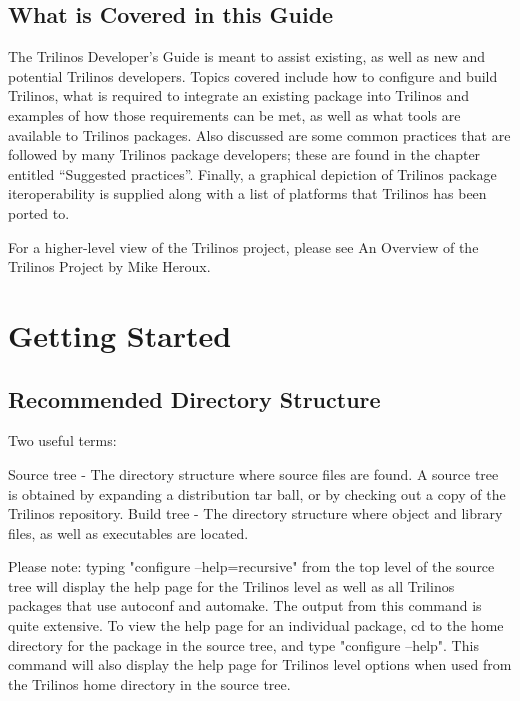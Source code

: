 \documentclass[12pt,relax]{SANDreport}
\begin{document}
	\subsection{What is Covered in this Guide}

The Trilinos Developer's Guide is meant to assist existing, as well as new and
potential Trilinos developers.  Topics covered include how to configure and 
build Trilinos, what is required to integrate an existing package into Trilinos
and examples of how those requirements can be met, as well as what tools are 
available to Trilinos packages.  Also discussed are some common practices that 
are followed by many Trilinos package developers; these are found in the 
chapter entitled ``Suggested practices''.  Finally, a graphical depiction of 
Trilinos package iteroperability is supplied along with a list of platforms 
that Trilinos has been ported to.

For a higher-level view of the Trilinos project, please see An Overview
of the Trilinos Project by Mike Heroux. 

	\section{Getting Started}

\subsection{Recommended Directory Structure}

Two useful terms:

Source tree - The directory structure where source files are found.  A source 
	tree is obtained by expanding a distribution tar ball, or by checking 
	out a copy of the Trilinos repository.  
Build tree - The directory structure where object and library files, as well 
	as executables are located.  

Please note: typing "configure --help=recursive" from the top level of the 
source tree will display the help page for the Trilinos level as well as all 
Trilinos packages that use autoconf and automake.  The output from this command
is quite extensive.  To view the help page for an individual package, cd to 
the home directory for the package in the source tree, and type "configure 
--help".  This command will also display the help page for Trilinos level 
options when used from the Trilinos home directory in the source tree.
\end{document}

